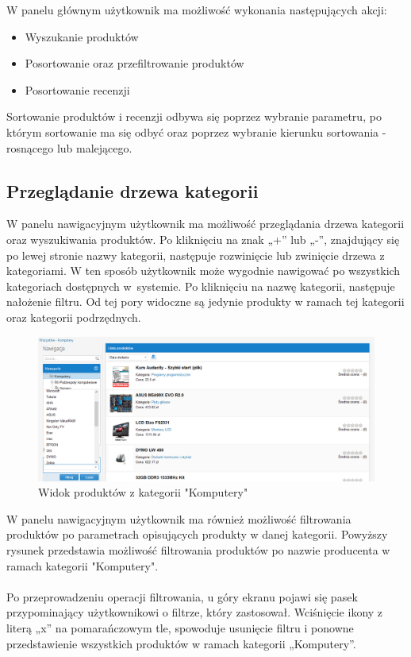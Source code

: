 W panelu głównym użytkownik ma możliwość wykonania następujących akcji:

\begin{itemize}
\item Wyszukanie produktów
\item Posortowanie oraz przefiltrowanie produktów
\item Posortowanie recenzji
\end{itemize}

Sortowanie produktów i recenzji odbywa się poprzez wybranie parametru, po którym sortowanie ma się odbyć oraz poprzez wybranie kierunku sortowania - rosnącego lub malejącego.

\subsection{Przeglądanie drzewa kategorii}

W panelu nawigacyjnym użytkownik ma możliwość przeglądania drzewa kategorii oraz wyszukiwania produktów. Po kliknięciu na znak „+” lub „-”, znajdujący się po lewej stronie nazwy kategorii, następuje rozwinięcie lub zwinięcie drzewa z kategoriami. W ten sposób użytkownik może wygodnie nawigować po wszystkich kategoriach dostępnych w~systemie. Po kliknięciu na nazwę kategorii, następuje nałożenie filtru. Od tej pory widoczne są jedynie produkty w ramach tej kategorii oraz kategorii podrzędnych.

\begin{figure}[h]
	\centering
	\includegraphics[width=1.00\textwidth]{images/filtr_kategorii.png}
	\caption{Widok produktów z kategorii "Komputery"}
\end{figure}

W panelu nawigacyjnym użytkownik ma również możliwość filtrowania produktów po parametrach opisujących produkty w danej kategorii. Powyższy rysunek przedstawia możliwość filtrowania produktów po nazwie producenta w ramach kategorii "Komputery".
\paragraph{}
Po przeprowadzeniu operacji filtrowania, u góry ekranu pojawi się pasek przypominający użytkownikowi o filtrze, który zastosował. Wciśnięcie ikony z literą „x” na pomarańczowym tle, spowoduje usunięcie filtru i ponowne przedstawienie wszystkich produktów w ramach kategorii „Komputery”.

